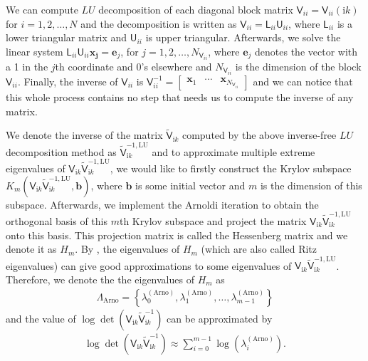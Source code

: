 We can compute $LU$ decomposition of each diagonal block matrix $\mathsf{V}_{ii} = \mathsf{V}_{ii}(\mathrm{i}k)$ for $i = 1, 2, \dots, N$ and the decomposition is 
written as $\mathsf{V}_{ii} = \mathsf{L}_{ii}\mathsf{U}_{ii} $, where $\mathsf{L}_{ii}$ is a lower triangular matrix and $\mathsf{U}_{ii}$ is upper triangular.
Afterwards, we solve the linear system $\mathsf{L}_{ii}\mathsf{U}_{ii}\boldsymbol{x_{j}} = \boldsymbol{e}_{j}$, for $j = 1, 2, \dots, N_{\mathsf{V}_{ii}}$, where $\boldsymbol{e}_{j}$ 
denotes the vector with a 1 in the $j$th coordinate and 0's elsewhere and $N_{\mathsf{V}_{ii}}$ is the dimension of the block $\mathsf{V}_{ii}$. Finally, the inverse of $\mathsf{V}_{ii}$ is 
$\mathsf{V}_{ii}^{-1} = \begin{bmatrix}
    \boldsymbol{x}_{1} & \cdots & \boldsymbol{x}_{N_{\mathsf{V}_{ii}}}
\end{bmatrix}$ and we can notice that this whole process contains no step that needs us to compute the inverse of any matrix. 

We denote the inverse of the matrix $\tilde{\mathsf{V}}_{\mathrm{i}k}$ computed by the above inverse-free $LU$ decomposition method as 
$\tilde{\mathsf{V}}_{\mathrm{i}k}^{-1,\text{LU}}$ and to approximate multiple extreme eigenvalues of 
$\mathsf{V}_{\mathrm{i}k}\tilde{\mathsf{V}}_{\mathrm{i}k}^{-1,\text{LU}}$, we would like to firstly construct the Krylov subspace  
$K_{m}(\mathsf{V}_{\mathrm{i}k}\tilde{\mathsf{V}}_{\mathrm{i}k}^{-1,\text{LU}}, \boldsymbol{b})$, where $\boldsymbol{b}$ is some 
initial vector and $m$ is the dimension of this subspace. Afterwards, we implement the Arnoldi iteration to obtain the orthogonal basis of this $m$th Krylov 
subspace and project the matrix $\mathsf{V}_{\mathrm{i}k}\tilde{\mathsf{V}}_{\mathrm{i}k}^{-1,\text{LU}}$ onto this basis. 
This projection matrix is called the Hessenberg matrix and we denote it as $H_{m}$. By \cite{saad2011numerical}, the eigenvalues of $H_{m}$ (which are also 
called Ritz eigenvalues) can give good approximations to some eigenvalues of $\mathsf{V}_{\mathrm{i}k}\tilde{\mathsf{V}}_{\mathrm{i}k}^{-1,\text{LU}}$.
Therefore, we denote the the eigenvalues of $H_{m}$ as 
\begin{align}\label{Eigenvalues of Hessenberg}
    \Lambda_{\text{Arno}} = \left\{\lambda_{0}^{(\text{Arno})}, \lambda_{1}^{(\text{Arno})}, \dots, \lambda_{m-1}^{(\text{Arno})}\right\}
\end{align}
and the value of  $\log\det(\mathsf{V}_{\mathrm{i}k}\tilde{\mathsf{V}}_{\mathrm{i}k}^{-1})$ can be approximated by
\begin{align*}
    \log\det(\mathsf{V}_{\mathrm{i}k}\tilde{\mathsf{V}}_{\mathrm{i}k}^{-1}) \approx \sum_{i = 0}^{m-1}\log\left(\lambda_{i}^{(\text{Arno})}\right).
\end{align*}



